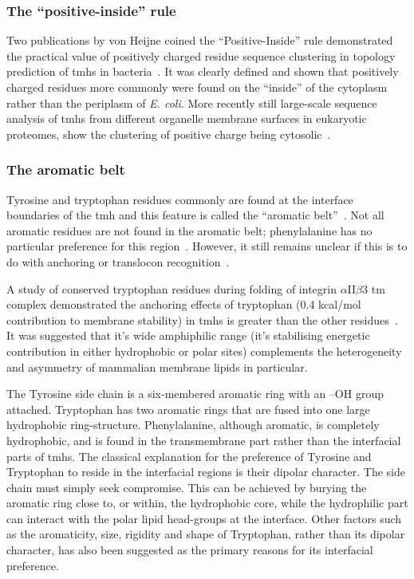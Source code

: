 \subsubsection{The ``positive\--inside'' rule}

Two publications by von Heijne coined the ``Positive-Inside'' rule demonstrated the practical value of positively charged residue sequence clustering in topology prediction of \gls{tmh}s in bacteria~\cite{VonHeijne1989,Andersson1992}.
It was clearly defined and shown that positively charged residues more commonly were found on the ``inside'' of the cytoplasm rather than the periplasm of \textit{ E.
coli}.
More recently still large-scale sequence analysis of \gls{tmh}s from different organelle membrane surfaces in eukaryotic proteomes, show the clustering of positive charge being cytosolic~\cite{Sharpe2010, Baeza-Delgado2013, Pogozheva2013}.

\subsubsection{The aromatic belt}

Tyrosine and tryptophan residues commonly are found at the interface boundaries of the \gls{tmh} and this feature is called the ``aromatic belt''~\cite{Hessa2005, Granseth2005, Sharpe2010, Baeza-Delgado2013, Nilsson2005a}.
Not all aromatic residues are not found in the aromatic belt; phenylalanine has no particular preference for this region~\cite{Granseth2005, Braun1999}.
However, it still remains unclear if this is to do with anchoring or translocon recognition~\cite{Baeza-Delgado2013}.

A study of conserved tryptophan residues during folding of integrin $\alpha$II$\beta$3 \gls{tm} complex demonstrated the anchoring effects of tryptophan (0.4 kcal/mol contribution to membrane stability) in \gls{tmh}s is greater than the other residues~\cite{Situ2018}. It was suggested that it's wide amphiphilic range (it's stabilising energetic contribution in either hydrophobic or polar sites) complements the heterogeneity and asymmetry of mammalian membrane lipids in particular.

The Tyrosine side chain is a six-membered aromatic ring with an –OH group attached.
Tryptophan has two aromatic rings that are fused into one large hydrophobic ring-structure.
Phenylalanine, although aromatic, is completely hydrophobic, and is found in the transmembrane part rather than the interfacial parts of \gls{tmh}s.
The classical explanation for the preference of Tyrosine and Tryptophan to reside in the interfacial regions is their dipolar character.
The side chain must simply seek compromise.
This can be achieved by burying the aromatic ring close to, or within, the hydrophobic core, while the hydrophilic part can interact with the polar lipid head-groups at the interface.
Other factors such as the aromaticity, size, rigidity and shape of Tryptophan, rather than its dipolar character, has also been suggested as the primary reasons for its interfacial preference.

